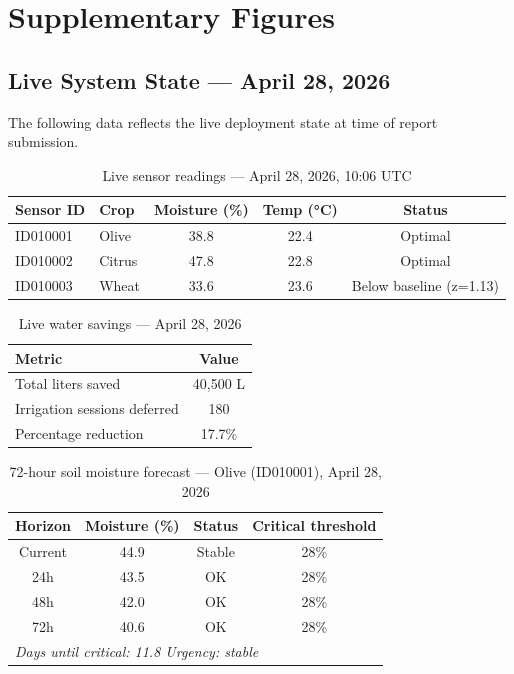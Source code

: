 \documentclass[12pt,a4paper]{report}
\begin{document}
\chapter{Supplementary Figures}

\section{Live System State --- April 28, 2026}

The following data reflects the live deployment state at time of report submission.

\begin{table}[H]
\centering
\caption{Live sensor readings --- April 28, 2026, 10:06 UTC}
\label{tab:live}
\begin{tabular}{llccc}
\toprule
\textbf{Sensor ID} & \textbf{Crop} & \textbf{Moisture (\%)} & \textbf{Temp (°C)} & \textbf{Status} \\
\midrule
ID010001 & Olive  & 38.8 & 22.4 & Optimal \\
ID010002 & Citrus & 47.8 & 22.8 & Optimal \\
ID010003 & Wheat  & 33.6 & 23.6 & Below baseline (z=1.13) \\
\bottomrule
\end{tabular}
\end{table}

\begin{table}[H]
\centering
\caption{Live water savings --- April 28, 2026}
\label{tab:savings}
\begin{tabular}{lc}
\toprule
\textbf{Metric} & \textbf{Value} \\
\midrule
Total liters saved      & 40,500 L \\
Irrigation sessions deferred & 180 \\
Percentage reduction    & 17.7\% \\
\bottomrule
\end{tabular}
\end{table}

\begin{table}[H]
\centering
\caption{72-hour soil moisture forecast --- Olive (ID010001), April 28, 2026}
\label{tab:forecast}
\begin{tabular}{cccc}
\toprule
\textbf{Horizon} & \textbf{Moisture (\%)} & \textbf{Status} & \textbf{Critical threshold} \\
\midrule
Current & 44.9 & Stable & 28\% \\
24h     & 43.5 & OK     & 28\% \\
48h     & 42.0 & OK     & 28\% \\
72h     & 40.6 & OK     & 28\% \\
\midrule
\multicolumn{4}{l}{\textit{Days until critical: 11.8 \quad Urgency: stable}} \\
\bottomrule
\end{tabular}
\end{table}
\end{document}
